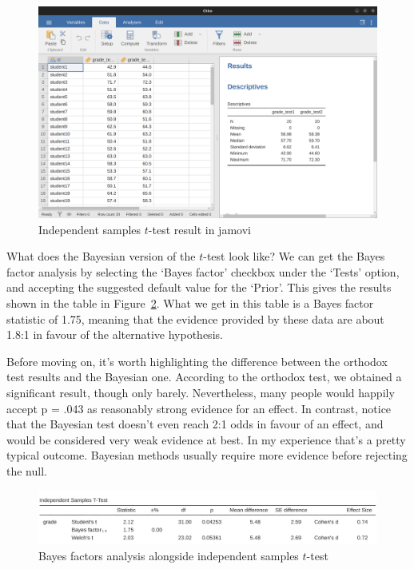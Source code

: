 \documentclass[
  a4paper,
]{book}
\begin{document}
\begin{figure}

\includegraphics[width=1\textwidth,height=\textheight]{images/fig11-12.png} \hfill{}

\caption{\label{fig-fig16-2}Independent samples \(t\)-test result in
jamovi}

\end{figure}

What does the Bayesian version of the \(t\)-test look like? We can get
the Bayes factor analysis by selecting the `Bayes factor' checkbox under
the `Tests' option, and accepting the suggested default value for the
`Prior'. This gives the results shown in the table in
Figure~\ref{fig-fig16-3}. What we get in this table is a Bayes factor
statistic of 1.75, meaning that the evidence provided by these data are
about 1.8:1 in favour of the alternative hypothesis.

Before moving on, it's worth highlighting the difference between the
orthodox test results and the Bayesian one. According to the orthodox
test, we obtained a significant result, though only barely.
Nevertheless, many people would happily accept p = .043 as reasonably
strong evidence for an effect. In contrast, notice that the Bayesian
test doesn't even reach 2:1 odds in favour of an effect, and would be
considered very weak evidence at best. In my experience that's a pretty
typical outcome. Bayesian methods usually require more evidence before
rejecting the null.

\begin{figure}

\includegraphics[width=1\textwidth,height=\textheight]{images/fig16-3.png} \hfill{}

\caption{\label{fig-fig16-3}Bayes factors analysis alongside independent
samples \(t\)-test}

\end{figure}
\end{document}
